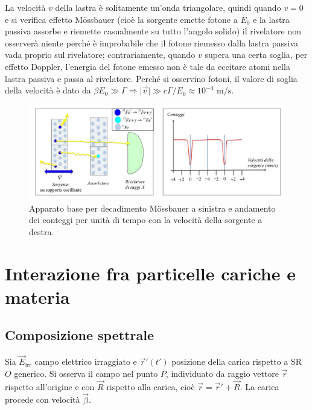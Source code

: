 \documentclass[10pt, a4paper]{scrartcl}
\numberwithin{equation}{subsection}
\theoremstyle{style1}
\begin{document}
La velocit\`a $v$ della lastra \`e solitamente un'onda triangolare, quindi quando $v=0$ e si verifica effetto M\"ossbauer (cio\`e la sorgente emette fotone a $E_0$ e la lastra passiva assorbe e riemette casualmente su tutto l'angolo solido) il rivelatore non osserver\`a niente perch\'e \`e improbabile che il fotone riemesso dalla lastra passiva vada proprio sul rivelatore; contrariamente, quando $v$ supera una certa soglia, per effetto Doppler, l'energia del fotone emesso non \`e tale da eccitare atomi nella lastra passiva e passa al rivelatore. 
Perch\'e si osservino fotoni, il valore di soglia della velocit\`a \`e dato da $\beta  E_0 \gg \Gamma\Rightarrow  \lvert \vec{v} \rvert \gg c\Gamma / E_0\approx 10^{-4} \text{ m}/\text{s}$.
\begin{figure}[h!]
	\centering
	\includegraphics[width=1\columnwidth]{mosdec.png}
	\caption{Apparato base per decadimento M\"ossbauer a sinistra e andamento dei conteggi per unit\`a di tempo con la velocit\`a della sorgente a destra.}
	\label{decmos}
\end{figure}
\newpage

\section{Interazione fra particelle cariche e materia}
\subsection{Composizione spettrale}\label{compspet}

Sia $\vec{E}_\text{irr}$ campo elettrico irraggiato e $\vec{r}'(t')$ posizione della carica rispetto a SR $O$ generico. Si osserva il campo nel punto $P$, individuato da raggio vettore $\vec{r}$ rispetto all'origine e con $\vec{R}$ rispetto alla carica, cio\`e $\vec{r}= \vec{r}' + \vec{R}$. La carica procede con velocit\`a $\vec{\beta }$.
\end{document}

